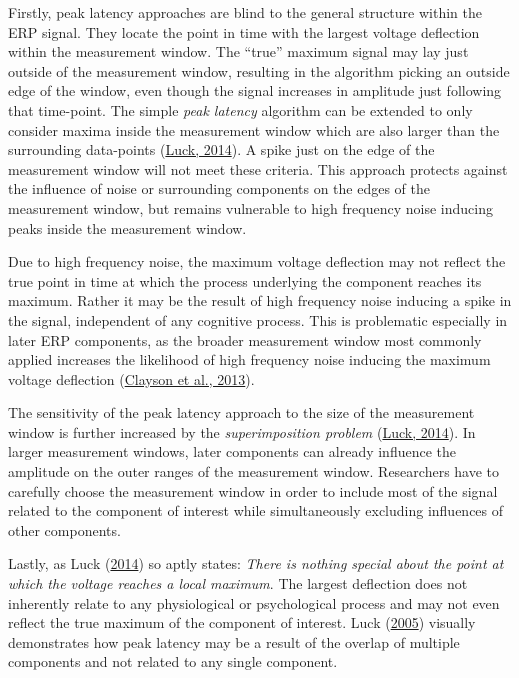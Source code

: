 \documentclass[
  man]{apa7}
\begin{document}
Firstly, peak latency approaches are blind to the general structure within the ERP signal. They locate the point in time with the largest voltage deflection within the measurement window. The ``true'' maximum signal may lay just outside of the measurement window, resulting in the algorithm picking an outside edge of the window, even though the signal increases in amplitude just following that time-point. The simple \emph{peak latency} algorithm can be extended to only consider maxima inside the measurement window which are also larger than the surrounding data-points (\protect\hyperlink{ref-luck2014introduction}{Luck, 2014}). A spike just on the edge of the measurement window will not meet these criteria. This approach protects against the influence of noise or surrounding components on the edges of the measurement window, but remains vulnerable to high frequency noise inducing peaks inside the measurement window.

Due to high frequency noise, the maximum voltage deflection may not reflect the true point in time at which the process underlying the component reaches its maximum. Rather it may be the result of high frequency noise inducing a spike in the signal, independent of any cognitive process. This is problematic especially in later ERP components, as the broader measurement window most commonly applied increases the likelihood of high frequency noise inducing the maximum voltage deflection (\protect\hyperlink{ref-clayson2013noise}{Clayson et al., 2013}).

The sensitivity of the peak latency approach to the size of the measurement window is further increased by the \emph{superimposition problem} (\protect\hyperlink{ref-luck2014introduction}{Luck, 2014}). In larger measurement windows, later components can already influence the amplitude on the outer ranges of the measurement window. Researchers have to carefully choose the measurement window in order to include most of the signal related to the component of interest while simultaneously excluding influences of other components.

Lastly, as Luck (\protect\hyperlink{ref-luck2014introduction}{2014}) so aptly states: \emph{There is nothing special about the point at which the voltage reaches a local maximum}. The largest deflection does not inherently relate to any physiological or psychological process and may not even reflect the true maximum of the component of interest. Luck (\protect\hyperlink{ref-luck2005ten}{2005}) visually demonstrates how peak latency may be a result of the overlap of multiple components and not related to any single component.
\end{document}
